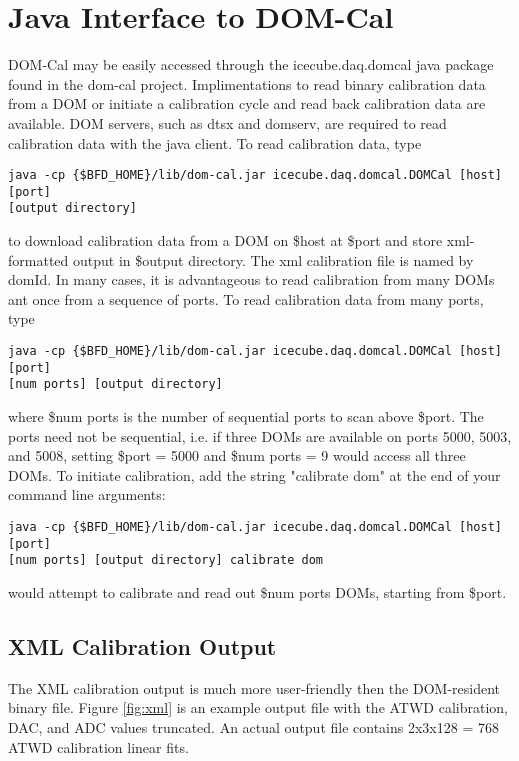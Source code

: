 \documentclass[10pt]{article}
\begin{document}
\section{Java Interface to DOM-Cal}
\label{sec:java}
DOM-Cal may be easily accessed through the icecube.daq.domcal java package found
in the dom-cal project.  Implimentations to read binary calibration data from a DOM
or initiate a calibration cycle and read back calibration data are available.  DOM
servers, such as dtsx and domserv, are required to read calibration data with the
java client.  To read calibration data, type
\begin{verbatim}
java -cp {$BFD_HOME}/lib/dom-cal.jar icecube.daq.domcal.DOMCal [host] [port]
[output directory]
\end{verbatim}
to download calibration data from a DOM on \$host at \$port and store xml-formatted
output in \$output directory.  The xml calibration file is named by domId.  In many
cases, it is advantageous to read calibration from many DOMs ant once from a sequence
of ports.  To read calibration data from many ports, type
\begin{verbatim}
java -cp {$BFD_HOME}/lib/dom-cal.jar icecube.daq.domcal.DOMCal [host] [port]
[num ports] [output directory]
\end{verbatim}
where \$num ports is the number of sequential ports to scan above \$port.  The ports
need not be sequential, i.e. if three DOMs are available on ports 5000, 5003, and 5008,
setting \$port = 5000 and \$num ports = 9 would access all three DOMs.  To initiate
calibration, add the string "calibrate dom" at the end of your command line arguments:
\begin{verbatim}
java -cp {$BFD_HOME}/lib/dom-cal.jar icecube.daq.domcal.DOMCal [host] [port]
[num ports] [output directory] calibrate dom
\end{verbatim}
would attempt to calibrate and read out \$num ports DOMs, starting from \$port.

\subsection{XML Calibration Output}

The XML calibration output is much more user-friendly then the DOM-resident binary
file.  Figure \ref{fig:xml} is an example output file with the ATWD calibration,
DAC, and ADC values truncated.
An actual output file contains 2x3x128 = 768 ATWD calibration linear fits.
\end{document}
